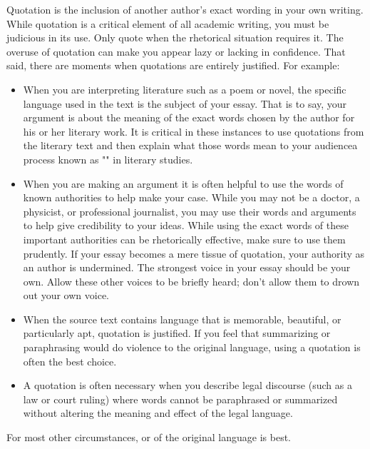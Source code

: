Quotation is the inclusion of another author's exact wording in your own writing. While quotation is a critical element of all academic writing, you must be judicious in its use. Only quote when the rhetorical situation 
requires it. The overuse of quotation can make you appear lazy or lacking in confidence. That said, there are moments when quotations are entirely justified. For example:

\begin{itemize}

\item When you are interpreting literature such as a poem or novel, the specific language used in the text is the subject of your essay. That is to say, your argument is about the meaning of the exact words chosen by the author for his or her literary work. It is critical in these instances to use quotations from the literary text and then explain what those words mean to your audience\textemdash a process known as "\hyperlink{closereadingessay}{\color{Ahrenge}{close reading}}" in literary studies. 


\item When you are making an argument it is often helpful to use the words of known authorities to help make your case. While you may not be a doctor, a physicist, or professional journalist, you may use their words and arguments to help give credibility to your ideas. While using the exact words of these important authorities can be rhetorically effective, make sure to use them prudently. If your essay becomes a mere tissue of quotation, your authority as an author is undermined. The strongest voice in your essay should be your own. Allow these other voices to be briefly heard; don't allow them to drown out your own voice.

\item When the source text contains language that is memorable, beautiful, or particularly apt, quotation is 
justified. If you feel that summarizing or paraphrasing would do violence to the original language, using a quotation is often the best choice.

\item A quotation is often necessary when you describe legal discourse (such as a law or court ruling) where words cannot be paraphrased or summarized without altering the meaning and effect of the legal language.

\end{itemize}

\noindent For most other circumstances, \hyperlink{summary}{\color{Ahrenge}{summary}} or \hyperlink{paraphrase}{\color{Ahrenge}{paraphrase}} of the original language is best.

